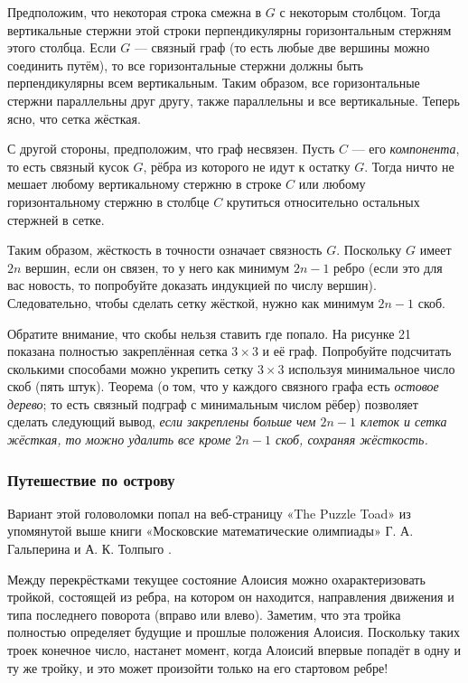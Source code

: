 Предположим, что некоторая строка смежна в $G$ с некоторым столбцом.
Тогда вертикальные стержни этой строки перпендикулярны горизонтальным стержням этого столбца.
Если $G$ --- связный граф (то есть любые две вершины можно соединить путём), то все горизонтальные стержни должны быть перпендикулярны всем вертикальным.
Таким образом, все горизонтальные стержни параллельны друг другу,
также параллельны и все вертикальные.
Теперь ясно, что сетка жёсткая.

С другой стороны, предположим, что граф несвязен.
Пусть $C$ --- его \emph{компонента}, то есть связный кусок $G$, рёбра из которого не идут к остатку $G$.
Тогда ничто не мешает любому вертикальному стержню в строке $C$ или любому горизонтальному стержню в столбце $C$ крутиться относительно остальных стержней в сетке.

Таким образом, жёсткость в точности означает связность $G$.
Поскольку $G$ имеет $2n$ вершин, если он связен, то у него как минимум $2n - 1$ ребро
(если это для вас новость, то попробуйте доказать индукцией по числу вершин).
Следовательно, чтобы сделать сетку жёсткой, нужно как минимум $2n - 1$ скоб.

Обратите внимание, что скобы нельзя ставить где попало.
На рисунке 21 показана полностью закреплённая сетка $3 \times 3$ и её граф.
Попробуйте подсчитать сколькими способами можно укрепить сетку $3 \times 3$ используя минимальное число скоб  (пять штук).
Теорема (о том, что у каждого связного графа есть \emph{остовое дерево}; то есть связный подграф с минимальным числом рёбер) позволяет сделать следующий вывод, \emph{если закреплены больше чем $2n - 1$ клеток и сетка жёсткая, то можно удалить все кроме $2n - 1$ скоб, сохраняя жёсткость.}

\subsubsection*{Путешествие по острову}

Вариант этой головоломки попал на веб-страницу «The Puzzle Toad» \cite{bohman-pikhurko-frieze-sleator} из упомянутой выше книги «Московские математические олимпиады» Г. А. Гальперина и А. К. Толпыго \cite{23}.

Между перекрёстками текущее состояние Алоисия можно охарактеризовать тройкой, состоящей из ребра, на котором он находится, направления движения и типа последнего поворота (вправо или влево).
Заметим, что эта тройка полностью определяет будущие и прошлые положения Алоисия.
Поскольку таких троек конечное число, настанет момент, когда Алоисий впервые попадёт в одну и ту же тройку, и это может произойти только на его стартовом ребре!

